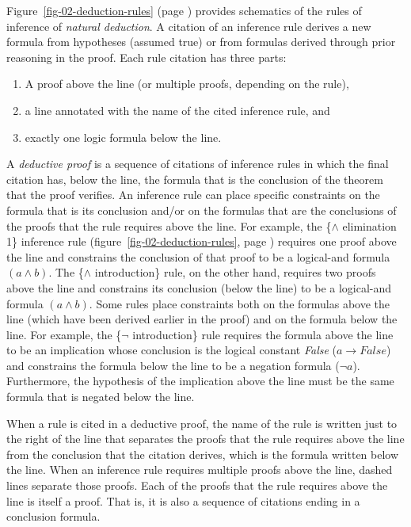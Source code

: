 Figure~\ref{fig-02-deduction-rules} (page \pageref{fig-02-deduction-rules})
provides schematics of the rules of inference of \emph{natural deduction}.
A citation of an inference rule derives a new formula
from hypotheses (assumed true) or from formulas derived through prior reasoning in the proof.
Each rule citation
has three parts:
\begin{enumerate}
\item A proof above the line (or multiple proofs, depending on the rule),
\item a line annotated with the name of the cited inference rule, and
\item exactly one logic formula below the line.
\end{enumerate}

\label{def-deductive-proof}
A \emph{deductive proof} is a sequence of citations of inference rules
in which the final citation has, below the line,
the formula that is the conclusion of the theorem that the proof verifies.
An inference rule can place specific constraints on the formula
that is its conclusion and/or on the formulas that are the
conclusions of the proofs that the rule requires above the line.
For example, the \{$\wedge$ elimination 1\} inference rule
(figure~\ref{fig-02-deduction-rules}, page \pageref{fig-02-deduction-rules})
requires one proof
above the line
and constrains the conclusion of that proof
to be a logical-and formula $(a \wedge b)$.
The \{$\wedge$ introduction\} rule, on the other hand,
requires two proofs above the line and
constrains its conclusion (below the line)
to be a logical-and formula $(a \wedge b)$.
Some rules place constraints both on the formulas
above the line (which have been derived earlier in the proof)
and on the formula
below the line.
For example, the \{$\neg$ introduction\} rule requires
the formula above the line to be an implication
whose conclusion is the logical constant \emph{False}
($a \rightarrow False$)
and constrains the formula below the line to be
a negation formula ($\neg a$).
Furthermore, the hypothesis of the implication above the line must be the same
formula that is negated below the line.

When a rule is
cited
in a deductive proof,
the name of the rule is written just to the right of
the line that separates the proofs that the rule requires above the line
from the conclusion that the citation derives,
which is the formula written below the line.
When an inference rule requires multiple proofs above the line,
dashed lines separate those proofs.
Each of the proofs that the rule requires above the line
is itself a proof.
That is, it is also a sequence of citations ending in a conclusion formula.


